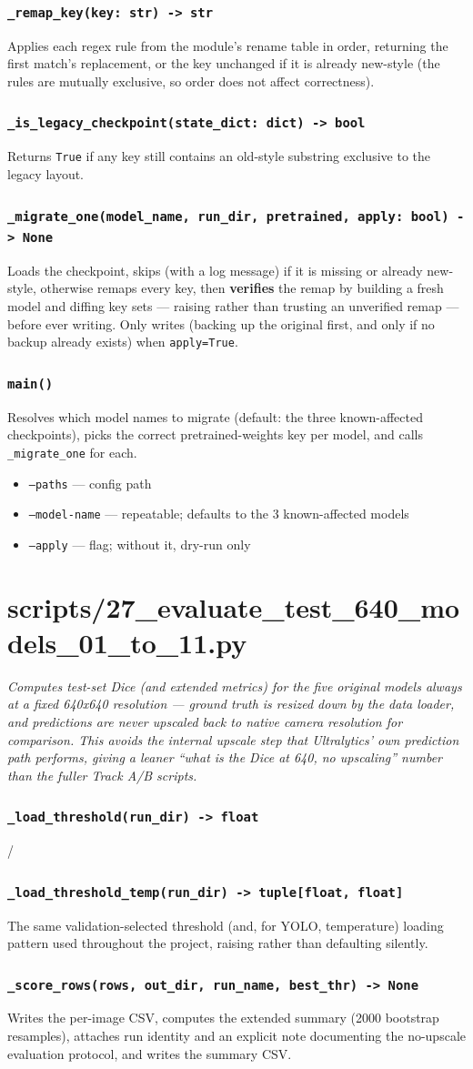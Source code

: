 \documentclass[11pt]{article}
\newcommand{\role}[1]{\par\noindent\textit{#1}\par\vspace{0.5em}}
\newcommand{\func}[1]{\subsubsection*{\texttt{#1}}}
\newcommand{\cliarg}[2]{\item \texttt{#1} --- #2}
\begin{document}
\func{\_remap\_key(key: str) -> str}
Applies each regex rule from the module's rename table in order, returning the
first match's replacement, or the key unchanged if it is already new-style
(the rules are mutually exclusive, so order does not affect correctness).

\func{\_is\_legacy\_checkpoint(state\_dict: dict) -> bool}
Returns \texttt{True} if any key still contains an old-style substring
exclusive to the legacy layout.

\func{\_migrate\_one(model\_name, run\_dir, pretrained, apply: bool) -> None}
Loads the checkpoint, skips (with a log message) if it is missing or already
new-style, otherwise remaps every key, then \textbf{verifies} the remap by
building a fresh model and diffing key sets --- raising rather than trusting an
unverified remap --- before ever writing. Only writes (backing up the original
first, and only if no backup already exists) when \texttt{apply=True}.

\func{main()}
Resolves which model names to migrate (default: the three known-affected
checkpoints), picks the correct pretrained-weights key per model, and calls
\texttt{\_migrate\_one} for each.

\begin{itemize}[nosep]
\cliarg{--paths}{config path}
\cliarg{--model-name}{repeatable; defaults to the 3 known-affected models}
\cliarg{--apply}{flag; without it, dry-run only}
\end{itemize}

\section{scripts/27\_evaluate\_test\_640\_models\_01\_to\_11.py}
\role{Computes test-set Dice (and extended metrics) for the five original
models always at a fixed 640x640 resolution --- ground truth is resized down by
the data loader, and predictions are \emph{never} upscaled back to native
camera resolution for comparison. This avoids the internal upscale step that
Ultralytics' own prediction path performs, giving a leaner ``what is the Dice
at 640, no upscaling'' number than the fuller Track A/B scripts.}

\func{\_load\_threshold(run\_dir) -> float} / \func{\_load\_threshold\_temp(run\_dir) -> tuple[float, float]}
The same validation-selected threshold (and, for YOLO, temperature) loading
pattern used throughout the project, raising rather than defaulting silently.

\func{\_score\_rows(rows, out\_dir, run\_name, best\_thr) -> None}
Writes the per-image CSV, computes the extended summary (2000 bootstrap
resamples), attaches run identity and an explicit note documenting the
no-upscale evaluation protocol, and writes the summary CSV.
\end{document}
